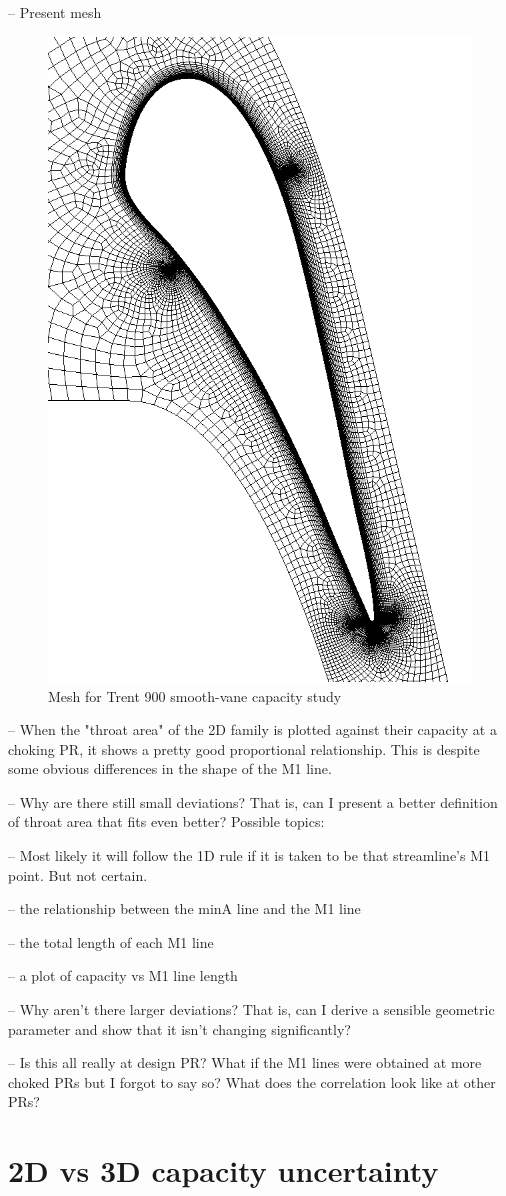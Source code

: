 \documentclass[a4paper, 11pt, twoside]{report}
\begin{document}
-- Present mesh
\begin{figure}[H]
      \centering
      \includegraphics[width=.45\textwidth]{figs/T900_smooth_vane_mesh_placeholder.png}
      \caption{Mesh for Trent 900 smooth-vane capacity study}
      \label{fig:T900_mesh_1}
\end{figure}

-- When the "throat area" of the 2D family is plotted against their capacity at a choking PR, it shows a pretty good proportional relationship. This is despite some obvious differences in the shape of the M1 line.

-- Why are there still small deviations? That is, can I present a better definition of throat area that fits even better? Possible topics:

 -- Most likely it will follow the 1D rule if it is taken to be that streamline's M1 point. But not certain.
 
 -- the relationship between the minA line and the M1 line
 
 -- the total length of each M1 line
 
 -- a plot of capacity vs M1 line length

-- Why aren't there larger deviations? That is, can I derive a sensible geometric parameter and show that it isn't changing significantly?

-- Is this all really at design PR? What if the M1 lines were obtained at more choked PRs but I forgot to say so? What does the correlation look like at other PRs?


\section{2D vs 3D capacity uncertainty}
\end{document}
